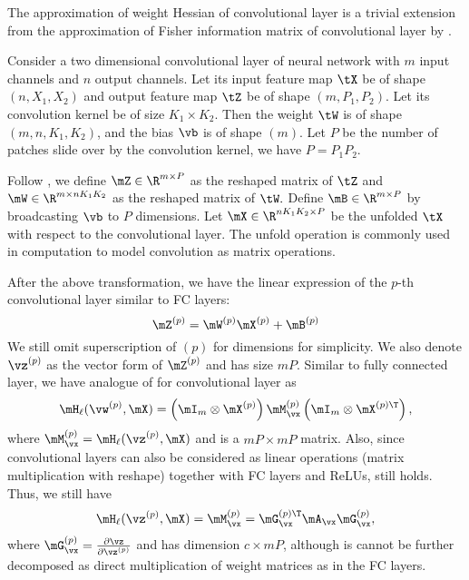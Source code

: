 \label{sec:appendix_conv}
The approximation of weight Hessian of convolutional layer is a trivial extension from the approximation of Fisher information matrix of convolutional layer by \citet{grosse2016kronecker}.

Consider a two dimensional convolutional layer of neural network with $m$ input channels and $n$ output channels. Let its input feature map $\tX$ be of shape $(n, X_1, X_2)$ and output feature map $\tZ$ be of shape $(m, P_1, P_2)$. Let its convolution kernel be of size $K_1\times K_2$. Then the weight $\tW$ is of shape $(m, n, K_1, K_2)$, and the bias $\vb$ is of shape $(m)$. Let $P$ be the number of patches slide over by the convolution kernel, we have $P=P_1P_2$.

Follow  \citet{dangel2020modular}, we define $\mZ\in\R^{m\times P}$ as the reshaped matrix of $\tZ$ and $\mW\in\R^{m \times nK_1K_2}$ as the reshaped matrix of $\tW.$
Define $\mB\in\R^{m\times P}$ by broadcasting $\vb$ to $P$ dimensions. Let $\mX\in\R^{nK_1K_2 \times P}$ be the unfolded $\tX$ with respect to the convolutional layer. The unfold operation \citep{NEURIPS2019_9015} is commonly used in computation to model convolution as matrix operations.

After the above transformation, we have the linear expression of the $p$-th convolutional layer similar to FC layers:\begin{equation}
    \label{eqn:conv_linear}
    \mZ^{(p)} = \mW^{(p)}\mX^{(p)} + \mB^{(p)}
\end{equation}
We still omit superscription of $(p)$ for dimensions for simplicity. We also denote $\vz^{(p)}$ as the vector form of $\mZ^{(p)}$ and has size $mP$.
Similar to fully connected layer, we have analogue of  for convolutional layer as
\begin{equation}
    \label{eqn:appendix_closeformhessian_conv}
    \mH_\ell(\vw^{(p)}, \mX) = \left(\mI_{m} \otimes \mX^{(p)}\right)\mM_\vx^{(p)}\left(\mI_{m} \otimes \mX^{(p)\T}\right),
\end{equation}
where $\mM_\vx^{(p)} = \mH_\ell(\vz^{(p)}, \mX)$ and is a $mP \times mP$ matrix.
Also, since convolutional layers can also be considered as linear operations (matrix multiplication with reshape) together with FC layers and ReLUs,  still holds. Thus, we still have  \begin{equation}
    \mH_\ell(\vz^{(p)}, \mX) = \mM_\vx^{(p)} = \mG_\vx^{(p)\T}\mA_\vx\mG_\vx^{(p)},
\end{equation}
where $\mG_\vx^{(p)} = \frac{\partial \vz}{\partial\vz^{(p)}}$ and has dimension $c \times mP$, although is cannot be further decomposed as direct multiplication of weight matrices as in the FC layers.

